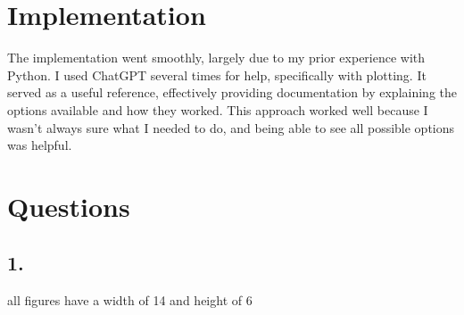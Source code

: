 \documentclass{article}
\begin{document}
\section*{Implementation}
The implementation went smoothly, largely due to my prior experience with Python. I used ChatGPT several times for help, specifically with plotting. It served as a useful reference, effectively providing documentation by explaining the options available and how they worked. This approach worked well because I wasn't always sure what I needed to do, and being able to see all possible options was helpful.

\section*{Questions}
\subsection*{1.}
all figures have a width of 14 and height of 6
\end{document}

